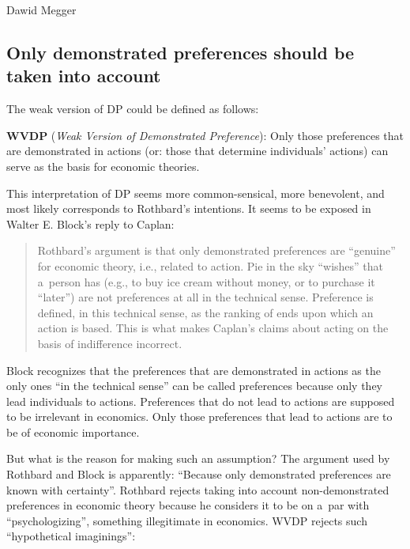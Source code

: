 \begin{artengenv}{Dawid Megger}
\subsection{Only demonstrated preferences should be taken into account}



The weak version of DP could be defined as follows:

\medskip

\noindent \textbf{WVDP} (\textit{Weak Version of Demonstrated Preference}): Only those preferences that are demonstrated in actions (or: those that determine individuals' actions) can serve as the basis for economic theories.

\medskip

This interpretation of DP seems more common-sensical, more benevolent, and most likely corresponds to Rothbard's intentions. It seems to be exposed in Walter E. Block's reply to Caplan:



\begin{quote}
Rothbard's argument is that only demonstrated preferences are ``genuine'' for economic theory, i.e., related to action. Pie in the sky ``wishes'' that a~person has (e.g., to buy ice cream without money, or to purchase it ``later'') are not preferences at all in the technical sense. Preference is defined, in this technical sense, as the ranking of ends upon which an action is based. This is what makes Caplan's claims about acting on the basis of indifference incorrect. 
\parencite[][p.23]{block_austrian_1999}%
\end{quote}




Block recognizes that the preferences that are demonstrated in actions as the only ones ``in the technical sense'' can be called preferences because only they lead individuals to actions. Preferences that do not lead to actions are supposed to be irrelevant in economics. Only those preferences that lead to actions are to be of economic importance.



But what is the reason for making such an assumption? The argument used by Rothbard and Block is apparently: ``Because only demonstrated preferences are known with certainty''. Rothbard rejects taking into account non-demonstrated preferences in economic theory because he considers it to be on a~par with ``psychologizing'', something illegitimate in economics. WVDP rejects such ``hypothetical imaginings'':




\end{artengenv}
